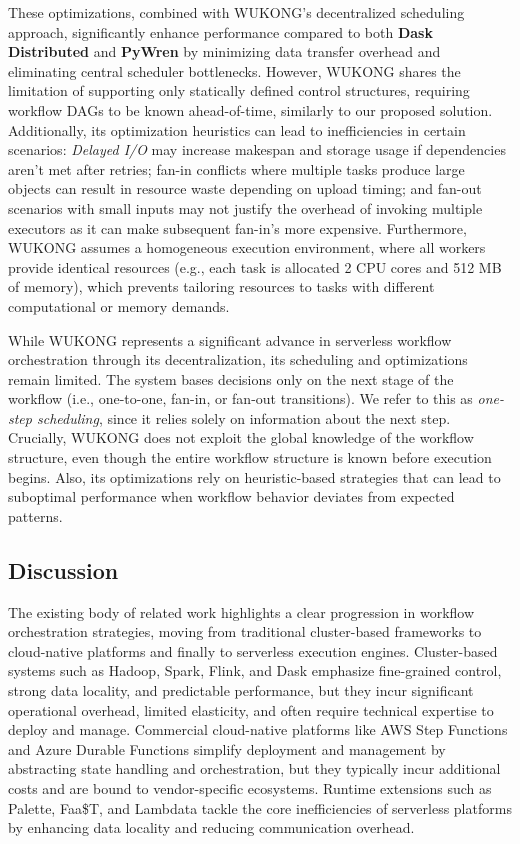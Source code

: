 \documentclass[conference]{IEEEtran}
\begin{document}
These optimizations, combined with WUKONG's decentralized scheduling approach, significantly enhance performance compared to both \textbf{Dask Distributed} and \textbf{PyWren} by minimizing data transfer overhead and eliminating central scheduler bottlenecks. However, WUKONG shares the limitation of supporting only statically defined control structures, requiring workflow DAGs to be known ahead-of-time, similarly to our proposed solution. Additionally, its optimization heuristics can lead to inefficiencies in certain scenarios: \textit{Delayed I/O} may increase makespan and storage usage if dependencies aren't met after retries; fan-in conflicts where multiple tasks produce large objects can result in resource waste depending on upload timing; and fan-out scenarios with small inputs may not justify the overhead of invoking multiple executors as it can make subsequent fan-in's more expensive. Furthermore, WUKONG assumes a homogeneous execution environment, where all workers provide identical resources (e.g., each task is allocated 2 CPU cores and 512 MB of memory), which prevents tailoring resources to tasks with different computational or memory demands.

While WUKONG represents a significant advance in serverless workflow orchestration through its decentralization, its scheduling and optimizations remain limited. The system bases decisions only on the next stage of the workflow (i.e., one-to-one, fan-in, or fan-out transitions). We refer to this as \textit{one-step scheduling}, since it relies solely on information about the next step. Crucially, WUKONG does not exploit the global knowledge of the workflow structure, even though the entire workflow structure is known before execution begins. Also, its optimizations rely on heuristic-based strategies that can lead to suboptimal performance when workflow behavior deviates from expected patterns.

\subsection{Discussion}
The existing body of related work highlights a clear progression in workflow orchestration strategies, moving from traditional cluster-based frameworks to cloud-native platforms and finally to serverless execution engines. Cluster-based systems such as Hadoop, Spark, Flink, and Dask emphasize fine-grained control, strong data locality, and predictable performance, but they incur significant operational overhead, limited elasticity, and often require technical expertise to deploy and manage. Commercial cloud-native platforms like AWS Step Functions and Azure Durable Functions simplify deployment and management by abstracting state handling and orchestration, but they typically incur additional costs and are bound to vendor-specific ecosystems. Runtime extensions such as Palette, Faa\$T, and Lambdata tackle the core inefficiencies of serverless platforms by enhancing data locality and reducing communication overhead.
\end{document}
